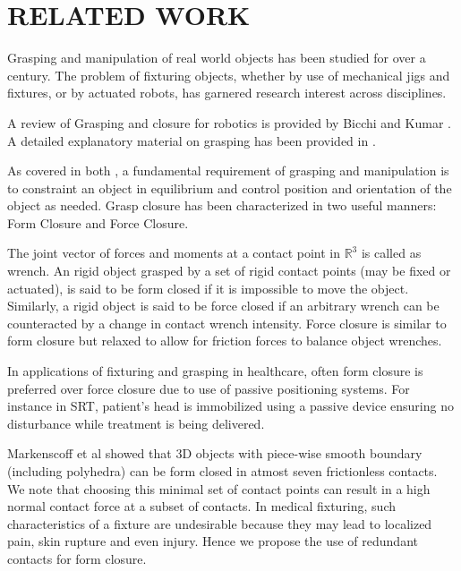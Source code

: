 
\section{RELATED WORK}
\label{sec:relatedWork}

Grasping and manipulation of real world objects has been studied for over 
a century. The problem of fixturing objects, whether by use of mechanical 
jigs and fixtures, or by actuated robots, has garnered research interest across
disciplines.

A review of Grasping and closure for robotics is provided by 
Bicchi and Kumar \cite{bicchi2000robotic}. A detailed explanatory material 
on grasping has been provided in \cite{prattichizzo2008grasping}. 

As covered in both \cite{2000robotic, prattichizzo2008grasping}, a 
fundamental requirement of grasping and manipulation is to constraint an object 
in equilibrium and control position and orientation of the object as needed. 
Grasp closure has been characterized in two useful manners: Form Closure and
Force Closure. 

The joint vector of forces and moments at a contact point in $\mathbb{R}^3$ is 
called as wrench. An rigid object grasped by a set of rigid contact points 
(may be fixed or actuated), is said to be form closed if it is impossible to 
move the object. Similarly, a rigid object is said to be force closed if an 
arbitrary wrench can be counteracted by a change in contact wrench intensity.
Force closure is similar to form closure but relaxed to allow for friction 
forces to balance object wrenches. 

In applications of fixturing and grasping in healthcare, often form closure
is preferred  over force closure due to use of passive positioning systems. 
For instance in SRT, patient's head is immobilized using a passive device
ensuring no disturbance while treatment is being delivered. 

Markenscoff et al \cite{markenscoff1990geometry} showed that 3D objects with 
piece-wise smooth boundary (including polyhedra) can be form closed in atmost
seven frictionless contacts. We note that choosing this minimal 
set of contact points can result in a high normal contact force at a subset of 
contacts. In medical fixturing, such characteristics of a fixture are 
undesirable because they may lead to localized pain, skin rupture 
and even injury. Hence we propose the use of redundant contacts for form closure. 

